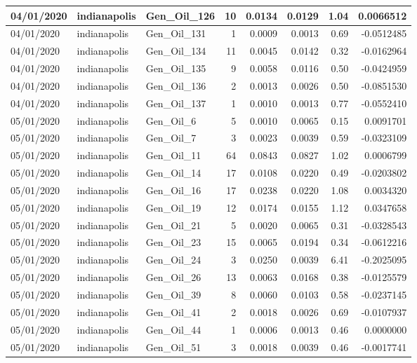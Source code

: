 \documentclass[
  letterpaper,
  DIV=11,
  numbers=noendperiod]{scrartcl}
\begin{document}
\begin{tabular}{l|l|l|r|r|r|r|r}
\hline
04/01/2020 & indianapolis & Gen\_Oil\_126 & 10 & 0.0134 & 0.0129 & 1.04 & 0.0066512\\
\hline
04/01/2020 & indianapolis & Gen\_Oil\_131 & 1 & 0.0009 & 0.0013 & 0.69 & -0.0512485\\
\hline
04/01/2020 & indianapolis & Gen\_Oil\_134 & 11 & 0.0045 & 0.0142 & 0.32 & -0.0162964\\
\hline
04/01/2020 & indianapolis & Gen\_Oil\_135 & 9 & 0.0058 & 0.0116 & 0.50 & -0.0424959\\
\hline
04/01/2020 & indianapolis & Gen\_Oil\_136 & 2 & 0.0013 & 0.0026 & 0.50 & -0.0851530\\
\hline
04/01/2020 & indianapolis & Gen\_Oil\_137 & 1 & 0.0010 & 0.0013 & 0.77 & -0.0552410\\
\hline
05/01/2020 & indianapolis & Gen\_Oil\_6 & 5 & 0.0010 & 0.0065 & 0.15 & 0.0091701\\
\hline
05/01/2020 & indianapolis & Gen\_Oil\_7 & 3 & 0.0023 & 0.0039 & 0.59 & -0.0323109\\
\hline
05/01/2020 & indianapolis & Gen\_Oil\_11 & 64 & 0.0843 & 0.0827 & 1.02 & 0.0006799\\
\hline
05/01/2020 & indianapolis & Gen\_Oil\_14 & 17 & 0.0108 & 0.0220 & 0.49 & -0.0203802\\
\hline
05/01/2020 & indianapolis & Gen\_Oil\_16 & 17 & 0.0238 & 0.0220 & 1.08 & 0.0034320\\
\hline
05/01/2020 & indianapolis & Gen\_Oil\_19 & 12 & 0.0174 & 0.0155 & 1.12 & 0.0347658\\
\hline
05/01/2020 & indianapolis & Gen\_Oil\_21 & 5 & 0.0020 & 0.0065 & 0.31 & -0.0328543\\
\hline
05/01/2020 & indianapolis & Gen\_Oil\_23 & 15 & 0.0065 & 0.0194 & 0.34 & -0.0612216\\
\hline
05/01/2020 & indianapolis & Gen\_Oil\_24 & 3 & 0.0250 & 0.0039 & 6.41 & -0.2025095\\
\hline
05/01/2020 & indianapolis & Gen\_Oil\_26 & 13 & 0.0063 & 0.0168 & 0.38 & -0.0125579\\
\hline
05/01/2020 & indianapolis & Gen\_Oil\_39 & 8 & 0.0060 & 0.0103 & 0.58 & -0.0237145\\
\hline
05/01/2020 & indianapolis & Gen\_Oil\_41 & 2 & 0.0018 & 0.0026 & 0.69 & -0.0107937\\
\hline
05/01/2020 & indianapolis & Gen\_Oil\_44 & 1 & 0.0006 & 0.0013 & 0.46 & 0.0000000\\
\hline
05/01/2020 & indianapolis & Gen\_Oil\_51 & 3 & 0.0018 & 0.0039 & 0.46 & -0.0017741\\

\end{tabular}
\end{document}
